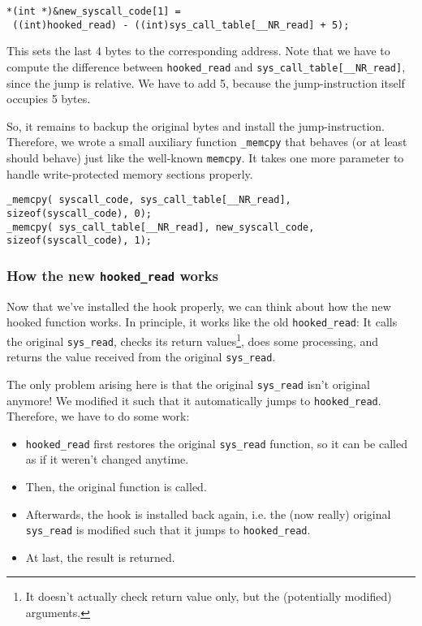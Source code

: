 \documentclass[10pt, letterpaper]{article}
\begin{document}
\begin{verbatim}
*(int *)&new_syscall_code[1] = 
 ((int)hooked_read) - ((int)sys_call_table[__NR_read] + 5);
\end{verbatim}

This sets the last 4 bytes to the corresponding address. Note that we have to compute the difference between \texttt{hooked\_read} and \texttt{sys\_call\_table[\_\_NR\_read]}, since the jump is relative. We have to add 5, because the jump-instruction itself occupies 5 bytes.

So, it remains to backup the original bytes and install the jump-instruction. Therefore, we wrote a small auxiliary function \texttt{\_memcpy} that behaves (or at least should behave) just like the well-known \texttt{memcpy}. It takes one more parameter to handle write-protected memory sections properly.

\begin{verbatim}
_memcpy( syscall_code, sys_call_table[__NR_read], sizeof(syscall_code), 0);
_memcpy( sys_call_table[__NR_read], new_syscall_code, sizeof(syscall_code), 1);
\end{verbatim}

\subsubsection{How the new \texttt{hooked\_read} works}
\label{sec:hooked-read-2-technique}

Now that we've installed the hook properly, we can think about how the new hooked function works. In principle, it works like the old \texttt{hooked\_read}: It calls the original \texttt{sys\_read}, checks its return values\footnote{It doesn't actually check return value only, but the (potentially modified) arguments.}, does some processing, and returns the value received from the original \texttt{sys\_read}.

The only problem arising here is that the original \texttt{sys\_read} isn't original anymore! We modified it such that it automatically jumps to \texttt{hooked\_read}. Therefore, we have to do some work: 

\begin{itemize}
\item \texttt{hooked\_read} first restores the original \texttt{sys\_read} function, so it can be called as if it weren't changed anytime.
\item Then, the original function is called.
\item Afterwards, the hook is installed back again, i.e. the (now really) original \texttt{sys\_read} is modified such that it jumps to \texttt{hooked\_read}.
\item At last, the result is returned.
\end{itemize}
\end{document}
